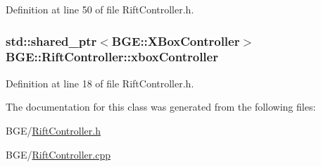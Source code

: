 Definition at line 50 of file Rift\-Controller.\-h.

\hypertarget{class_b_g_e_1_1_rift_controller_a32502254ff8a624efd6ebb872fd803a5}{
\subsubsection[{xbox\-Controller}]{\setlength{\rightskip}{0pt plus 5cm}std\-::shared\-\_\-ptr$<${\bf B\-G\-E\-::\-X\-Box\-Controller}$>$ B\-G\-E\-::\-Rift\-Controller\-::xbox\-Controller}}\label{class_b_g_e_1_1_rift_controller_a32502254ff8a624efd6ebb872fd803a5}


Definition at line 18 of file Rift\-Controller.\-h.



The documentation for this class was generated from the following files\-:\begin{DoxyCompactItemize}
\item 
B\-G\-E/\hyperlink{_rift_controller_8h}{Rift\-Controller.\-h}\item 
B\-G\-E/\hyperlink{_rift_controller_8cpp}{Rift\-Controller.\-cpp}\end{DoxyCompactItemize}
